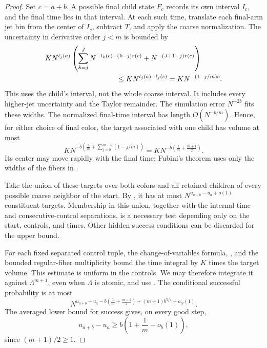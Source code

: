 \begin{proof}
Set \(c=a+b\).  A possible final child state \(F_c\) records its
own interval \(I_c\), and the final time lies in that interval.
At each such time, translate each final-arm jet bin from the
center of \(I_c\), subtract \(T\), and apply the coarse normalization.
The uncertainty in derivative order \(j<m\) is bounded by
\begin{align}
 &K N^{l_j(a)}
 \left(
 \sum_{k=j}^J N^{-l_k(c)-(k-j)r(c)}
 +N^{-(J+1-j)r(c)}
 \right) \notag\\
 &\hspace{35mm}\le
 K N^{l_j(a)-l_j(c)}
 =K N^{-(1-j/m)b}.
 \label{a02:final-target-widths}
\end{align}
This uses the child's interval, not the whole coarse interval.
It includes every higher-jet uncertainty and the Taylor remainder.
The simulation error \(N^{-2b}\) fits these widths.  The normalized
final-time interval has length \(O(N^{-b/m})\).  Hence, for either
choice of final color, the target associated with one child has
volume at most
\begin{equation}
 K N^{-b\left(\frac1m+\sum_{j=0}^{m-1}(1-j/m)\right)}
 =
 K N^{-b\left(\frac1m+\frac{m+1}{2}\right)}.
 \label{a02:target-volume}
\end{equation}
Its center may move rapidly with the final time; Fubini's theorem
uses only the widths of the fibers in .

Take the union of these targets over both colors and all retained
children of every possible coarse neighbor of the start.  By
, it has at most
\(N^{u_{a+b}-u_a+o(1)}\) constituent targets.  Membership in this
union, together with the internal-time and consecutive-control
separations, is a necessary test depending only on the start,
controls, and times.  Other hidden success conditions can be
discarded for the upper bound.

For each fixed separated control tuple, the change-of-variables
formula, , and the bounded regular-fiber
multiplicity bound the time integral by \(K\) times the target
volume.  This estimate is uniform in the controls.  We may therefore
integrate it against \(\Lambda^{m+1}\), even when \(\Lambda\) is
atomic, and use .  The conditional
successful probability is at most
\[
 N^{u_{a+b}-u_a
 -b\left(\frac1m+\frac{m+1}{2}\right)
 +(m+1)b^{5/4}+o_N(1)}.
\]
The averaged lower bound for success gives, on every good step,
\begin{equation}
 u_{a+b}-u_a
 \ge b\left(1+\frac1m-o_b(1)\right),
 \label{a02:entropy-increment}
\end{equation}
since \((m+1)/2\ge1\).


\end{proof}

